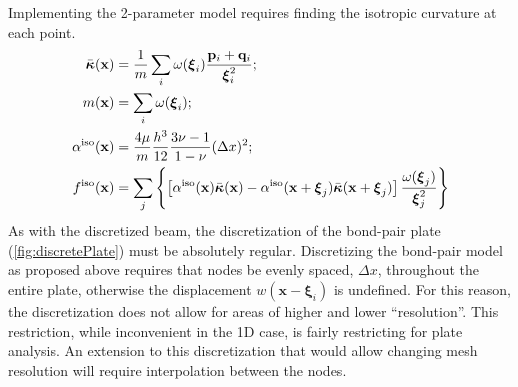 Implementing the 2-parameter model requires finding the isotropic curvature at each point.
%
\begin{align*}
    \bar{\boldsymbol{\kappa}}(\mathbf{x}) &= \frac{1}{m} \sum_i \omega(\boldsymbol{\xi}_i)\frac{\mathbf{p}_i +\mathbf{q}_i }{\boldsymbol{\xi}_i^2};\notag \\
    m(\mathbf{x})  &= \sum_i \omega(\boldsymbol{\xi}_i); \notag \\
    \alpha^\text{iso}(\mathbf{x}) &= \frac{4\mu}{m}\frac{h^3}{12}\frac{3\nu-1}{1-\nu}(\Delta x)^2;\\
    f^\text{iso}(\mathbf{x}) &= \sum_j \left\{\left[\alpha^\text{iso}(\mathbf{x})\bar{\boldsymbol{\kappa}}(\mathbf{x})-\alpha^\text{iso}(\mathbf{x}+\boldsymbol{\xi}_j)\bar{\boldsymbol{\kappa}}(\mathbf{x}+\boldsymbol{\xi}_j) \right] \frac{\omega(\boldsymbol{\xi}_j)}{\boldsymbol{\xi}_j^2} \right\}
\end{align*}
%
As with the discretized beam, the discretization of the bond-pair plate (\cref{fig:discretePlate}) must be absolutely regular. 
Discretizing the bond-pair model as proposed above requires that nodes be evenly spaced, $\Delta x$, throughout the entire plate, otherwise the displacement \(w(\mathbf{x}-\boldsymbol{\xi}_i)\) is undefined.  For this reason, the discretization does not allow for areas of higher and lower ``resolution''.  This restriction, while inconvenient in the 1D case, is fairly restricting for plate analysis. An extension to this discretization that would allow changing mesh resolution will require interpolation between the nodes.  
%
%
%
%
%  
%
%
